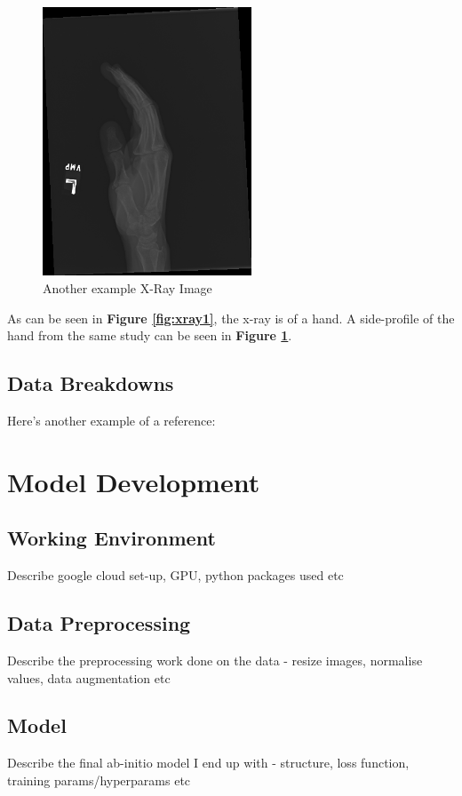 \documentclass[11pt]{article} %
\theoremstyle{plain}
\theoremstyle{definition}
\begin{document}
\begin{figure}[!ht]
  \caption{Another example X-Ray Image}
  \label{fig:xray2}
  \includegraphics[width=\textwidth, height=8cm]{image2}
  \centering
\end{figure}

As can be seen in \textbf{Figure \ref{fig:xray1}}, the x-ray is of a hand. A side-profile of the hand from the same study can be seen in \textbf{Figure \ref{fig:xray2}}.

\subsection{Data Breakdowns}
Here's another example of a reference:
\cite{MURA2017}



\newpage
\section{Model Development}

\subsection{Working Environment}
Describe google cloud set-up, GPU, python packages used etc

\subsection{Data Preprocessing}
Describe the preprocessing work done on the data - resize images, normalise values, data augmentation etc 

\subsection{Model}
Describe the final ab-initio model I end up with - structure, loss function, training params/hyperparams etc
\end{document}
